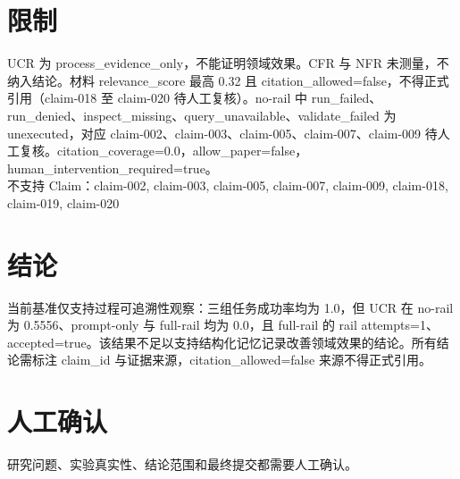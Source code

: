 \documentclass[UTF8]{ctexart}
\begin{document}
\section{限制}
UCR 为 process\_\allowbreak{}evidence\_\allowbreak{}only，不能证明领域效果。CFR 与 NFR 未测量，不纳入结论。材料 relevance\_\allowbreak{}score 最高 0.32 且 citation\_\allowbreak{}allowed=false，不得正式引用（claim-\allowbreak{}018 至 claim-\allowbreak{}020 待人工复核）。no-\allowbreak{}rail 中 run\_\allowbreak{}failed、run\_\allowbreak{}denied、inspect\_\allowbreak{}missing、query\_\allowbreak{}unavailable、validate\_\allowbreak{}failed 为 unexecuted，对应 claim-\allowbreak{}002、claim-\allowbreak{}003、claim-\allowbreak{}005、claim-\allowbreak{}007、claim-\allowbreak{}009 待人工复核。citation\_\allowbreak{}coverage=0.0，allow\_\allowbreak{}paper=false，human\_\allowbreak{}intervention\_\allowbreak{}required=true。\\
不支持 Claim：claim-\allowbreak{}002, claim-\allowbreak{}003, claim-\allowbreak{}005, claim-\allowbreak{}007, claim-\allowbreak{}009, claim-\allowbreak{}018, claim-\allowbreak{}019, claim-\allowbreak{}020
\section{结论}
当前基准仅支持过程可追溯性观察：三组任务成功率均为 1.0，但 UCR 在 no-\allowbreak{}rail 为 0.5556、prompt-\allowbreak{}only 与 full-\allowbreak{}rail 均为 0.0，且 full-\allowbreak{}rail 的 rail attempts=1、accepted=true。该结果不足以支持结构化记忆记录改善领域效果的结论。所有结论需标注 claim\_\allowbreak{}id 与证据来源，citation\_\allowbreak{}allowed=false 来源不得正式引用。
\section{人工确认}
研究问题、实验真实性、结论范围和最终提交都需要人工确认。
\end{document}
